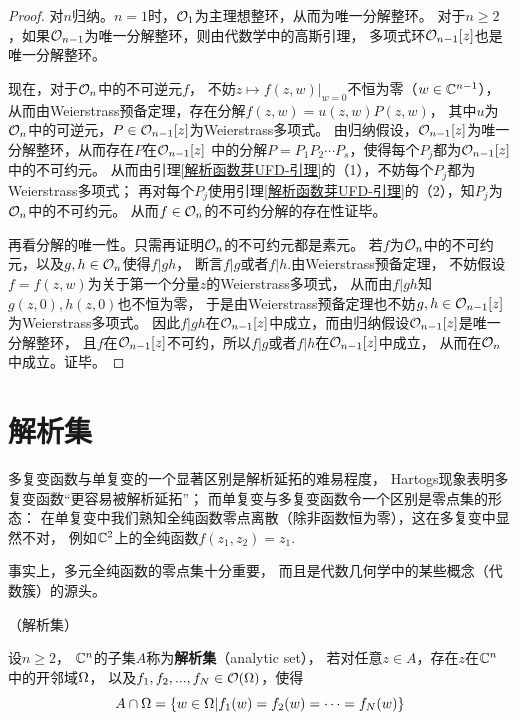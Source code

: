 \begin{proof}
对$n$归纳。$n=1$时，$\mathcal{O}_1$为主理想整环，从而为唯一分解整环。
对于$n\geq 2$，如果$\mathcal{O}_{n-1}$为唯一分解整环，则由代数学中的高斯引理，
多项式环$\mathcal{O}_{n-1}[z]$也是唯一分解整环。

现在，对于$\mathcal{O}_n$中的不可逆元$f$，
不妨$z\mapsto f(z,w)|_{w=0}$不恒为零（$w\in\mathbb{C}^{n-1}$），
从而由Weierstrass预备定理，存在分解$f(z,w)=u(z,w)P(z,w)$，
其中$u$为$\mathcal{O}_n$中的可逆元，$P\in\mathcal{O}_{n-1}[z]$为Weierstrass多项式。
由归纳假设，$\mathcal{O}_{n-1}[z]$为唯一分解整环，从而存在$P$在$\mathcal{O}_{n-1}[z]$
中的分解$P=P_1P_2\cdots P_s$，使得每个$P_j$都为$\mathcal{O}_{n-1}[z]$中的不可约元。
从而由引理\ref{解析函数芽UFD-引理}的（1），不妨每个$P_j$都为Weierstrass多项式；
再对每个$P_j$使用引理\ref{解析函数芽UFD-引理}的（2），知$P_j$为$\mathcal{O}_n$中的不可约元。
从而$f\in\mathcal{O}_n$的不可约分解的存在性证毕。

再看分解的唯一性。只需再证明$\mathcal{O}_n$的不可约元都是素元。
若$f$为$\mathcal{O}_n$中的不可约元，以及$g,h\in\mathcal{O}_n$使得$f|gh$，
断言$f|g$或者$f|h$.由Weierstrass预备定理，
不妨假设$f=f(z,w)$为关于第一个分量$z$的Weierstrass多项式，
从而由$f|gh$知$g(z,0),h(z,0)$也不恒为零，
于是由Weierstrass预备定理也不妨$g,h\in\mathcal{O}_{n-1}[z]$为Weierstrass多项式。
因此$f|gh$在$\mathcal{O}_{n-1}[z]$中成立，而由归纳假设$\mathcal{O}_{n-1}[z]$是唯一分解整环，
且$f$在$\mathcal{O}_{n-1}[z]$不可约，所以$f|g$或者$f|h$在$\mathcal{O}_{n-1}[z]$中成立，
从而在$\mathcal{O}_n$中成立。证毕。
\end{proof}

\section{解析集}
多复变函数与单复变的一个显著区别是解析延拓的难易程度，
Hartogs现象表明多复变函数“更容易被解析延拓”；
而单复变与多复变函数令一个区别是零点集的形态：
在单复变中我们熟知全纯函数零点离散（除非函数恒为零），这在多复变中显然不对，
例如$\mathbb{C}^2$上的全纯函数$f(z_1,z_2)=z_1$.

事实上，多元全纯函数的零点集十分重要，
而且是代数几何学中的某些概念（代数簇）的源头。

\begin{definition}（解析集）

设$n\geq 2$， $\mathbb{C}^n$的子集$A$称为\textbf{解析集}（analytic set），
若对任意$z\in A$，存在$z$在$\mathbb{C}^n$中的开邻域$\Omega$，
以及$f_1,f_2,...,f_N\in\mathcal{O}(\Omega)$，使得
$$A\cap\Omega=\{w\in\Omega|f_1(w)=f_2(w)=\cdots=f_N(w)\}$$
\end{definition}

